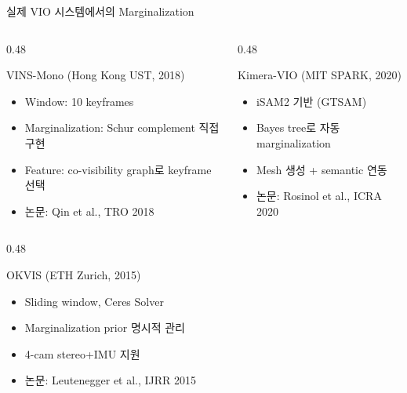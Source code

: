 \begin{frame}{실제 VIO 시스템에서의 Marginalization}
  \begin{columns}[T]
    \begin{column}{0.48\textwidth}
      \begin{block}{VINS-Mono (Hong Kong UST, 2018)}
        \begin{itemize}
          \item Window: 10 keyframes
          \item Marginalization: Schur complement 직접 구현
          \item Feature: co-visibility graph로 keyframe 선택
          \item 논문: Qin et al., TRO 2018
        \end{itemize}
      \end{block}
    \end{column}
    \begin{column}{0.48\textwidth}
      \begin{block}{Kimera-VIO (MIT SPARK, 2020)}
        \begin{itemize}
          \item iSAM2 기반 (GTSAM)
          \item Bayes tree로 자동 marginalization
          \item Mesh 생성 + semantic 연동
          \item 논문: Rosinol et al., ICRA 2020
        \end{itemize}
      \end{block}
    \end{column}
  \end{columns}
  \pause
  \vspace{0.4em}
  \begin{columns}[T]
    \begin{column}{0.48\textwidth}
      \begin{block}{OKVIS (ETH Zurich, 2015)}
        \begin{itemize}
          \item Sliding window, Ceres Solver
          \item Marginalization prior 명시적 관리
          \item 4-cam stereo+IMU 지원
          \item 논문: Leutenegger et al., IJRR 2015
        \end{itemize}
      \end{block}
    \end{column}

\end{columns}
\end{frame}
